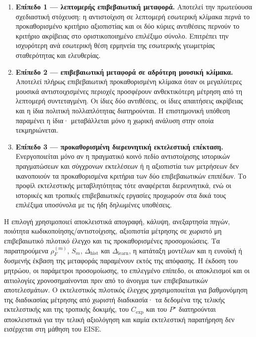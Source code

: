 \documentclass[11pt,a4paper]{article}
\begin{document}
\begin{enumerate}
\item \textbf{Επίπεδο 1 --- λεπτομερής επιβεβαιωτική μεταφορά.} Αποτελεί την πρωτεύουσα σχεδιαστική στόχευση: η αντιστοίχιση σε λεπτομερή εσωτερική κλίμακα περνά το προκαθορισμένο κριτήριο αξιοπιστίας και οι δύο κύριες αντιθέσεις περνούν το κριτήριο ακρίβειας στο οριστικοποιημένο επιλέξιμο σύνολο. Επιτρέπει την ισχυρότερη ανά εσωτερική θέση ερμηνεία της εσωτερικής γεωμετρίας σταθερότητας και ελευθερίας.
\item \textbf{Επίπεδο 2 --- επιβεβαιωτική μεταφορά σε αδρότερη μουσική κλίμακα.} Αποτελεί πλήρως επιβεβαιωτική προκαθορισμένη κλίμακα όταν οι μεγαλύτερες μουσικά αντιστοιχισμένες περιοχές προσφέρουν ανθεκτικότερη μέτρηση από τη λεπτομερή συντεταγμένη. Οι ίδιες δύο αντιθέσεις, οι ίδιες απαιτήσεις ακρίβειας και η ίδια πολιτική πολλαπλότητας διατηρούνται. Η επιστημονική υπόθεση παραμένει η ίδια· μεταβάλλεται μόνο η χωρική ανάλυση στην οποία τεκμηριώνεται.
\item \textbf{Επίπεδο 3 --- προκαθορισμένη διερευνητική εκτελεστική επέκταση.} Ενεργοποιείται μόνο αν η πραγματικό κοινό πεδίο αντιστοίχισης ιστορικών πραγματώσεων και σύγχρονων εκτελέσεων ή η αξιοπιστία των μετρήσεων δεν ικανοποιούν τα προκαθορισμένα κριτήρια των δύο επιβεβαιωτικών επιπέδων. Το προφίλ εκτελεστικής μεταβλητότητας τότε αναφέρεται διερευνητικά, ενώ οι ιστορικές και τροπικές επιβεβαιωτικές εργασίες προχωρούν στα δικά τους επιλέξιμα υποσύνολα με τις ήδη δηλωμένες υποθέσεις.
\end{enumerate}

Η επιλογή χρησιμοποιεί αποκλειστικά απογραφή, κάλυψη, ανεξαρτησία πηγών, ποιότητα κωδικοποίησης/αντιστοίχισης, αξιοπιστία μέτρησης σε χωριστό μη επιβεβαιωτικό πιλοτικό έλεγχο και τις προκαθορισμένες προσομοιώσεις. Τα παρατηρούμενα $\rho_F^{(m)}$, $S_m$, $\Delta_{\mathrm{hist}}$ και $\Delta_{\mathrm{learn}}$, η κατάταξη μοντέλων και η ευνοϊκή ή δυσμενής έκβαση της μεταφοράς παραμένουν εκτός της απόφασης. Η έκδοση του μητρώου, οι παράμετροι προσομοίωσης, το επιλεγμένο επίπεδο, οι αποκλεισμοί και οι αιτιολογίες χρονοσημαίνονται πριν από το άνοιγμα των επιβεβαιωτικών αποτελεσμάτων. Ο εκτελεστικός πιλοτικός έλεγχος χρησιμοποιείται για βαθμονόμηση της διαδικασίας μέτρησης από χωριστή διαδικασία· τα δεδομένα της τελικής εκτελεστικής και της τροπικής δοκιμής, του $C_{\mathrm{exp}}$ και του $P^\star$ διατηρούνται αποκλειστικά για την τελική αξιολόγηση και καμία εκτελεστική παρατήρηση δεν εισέρχεται στη μάθηση του EISE.
\end{document}
